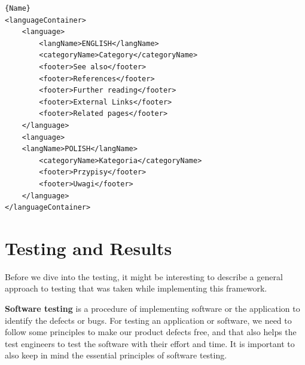\documentclass[thesis=M,english,hidelinks]{FITthesis}[2019/12/23]
\begin{document}
\begin{lstlisting}[caption=Example of an language configuration file,frame=tlrb,  label = {lst:language-list}]{Name}
<languageContainer>
	<language>
		<langName>ENGLISH</langName>
		<categoryName>Category</categoryName>
		<footer>See also</footer>
		<footer>References</footer>
		<footer>Further reading</footer>
		<footer>External Links</footer>
		<footer>Related pages</footer>
	</language>
	<language>
	<langName>POLISH</langName>
		<categoryName>Kategoria</categoryName>
		<footer>Przypisy</footer>
		<footer>Uwagi</footer>
	</language>
</languageContainer>
\end{lstlisting}

\chapter{Testing and Results}

Before we dive into the testing, it might be interesting to describe a general approach to testing that was taken while implementing this framework.

\textbf{Software testing} is a procedure of implementing software or the application to identify the defects or bugs. For testing an application or software, we need to follow some principles to make our product defects free, and that also helps the test engineers to test the software with their effort and time. It is important to also keep in mind the essential principles of software testing.
\end{document}
